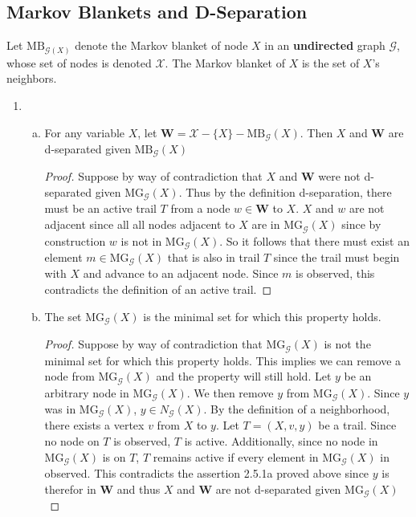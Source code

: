 \documentclass[12pt]{article}
\newcommand{\mg} {\text{MG}_{\mathcal{G}}}
\begin{document}
\subsection{Markov Blankets and D-Separation}
Let $\text{MB}_{\mathcal{G}(X)}$ denote the Markov blanket of node $X$ in an \textbf{undirected} graph $\mathcal{G}$, whose set of nodes is denoted $\mathcal{X}$. The Markov blanket of $X$ is the set of $X$'s neighbors. 
\begin{enumerate}[1.]	
	\item 
	\begin{enumerate}[(a)]
		\item For any variable $X$, let $\mathbf{W} = \mathcal{X} - \{X\} - \text{MB}_{\mathcal{G}}(X)$. Then $X$ and $\mathbf{W}$ are d-separated given $\text{MB}_{\mathcal{G}}(X)$
		\begin{proof}
		Suppose by way of contradiction that $X$ and $\mathbf{W}$ were not d-separated given $\text{MG}_{\mathcal{G}}(X)$. Thus by the definition d-separation, there must be an active trail $T$  from a node $w\in \mathbf{W}$ to $X$. $X$ and $w$ are not adjacent since all all nodes adjacent to $X$ are in $\text{MG}_{\mathcal{G}}(X)$ since by construction $w$ is not in $\text{MG}_{\mathcal{G}}(X)$. So it follows that there must exist an element $m \in \text{MG}_{\mathcal{G}}(X)$ that is also in trail $T$ since the trail must begin with $X$ and advance to an adjacent node. Since $m$ is observed, this contradicts the definition of an active trail.
		\end{proof}
	\item The set $\text{MG}_{\mathcal{G}}(X)$ is the minimal set for which this property holds. 
		\begin{proof}
		Suppose by way of contradiction that $\mg(X)$ is not the minimal set for which this property holds. This implies we can remove a node from $\mg(X)$ and the property will still hold. Let $y$ be an arbitrary node in $\mg(X)$. We then remove $y$ from $\mg(X)$. Since $y$ was in $\mg(X)$,  $y \in N_\mathcal{G}(X)$. By the definition of a neighborhood, there exists a vertex $v$ from $X$ to $y$.  Let $T = (X, v, y)$ be a trail. Since no node on $T$ is observed, $T$ is active. Additionally, since no node in $\mg(X)$ is on $T$, $T$ remains active if every element in $\mg(X)$ in observed. This contradicts the assertion 2.5.1a proved above since $y$ is therefor in $\mathbf{W}$ and thus $X$ and $\mathbf{W}$ are not d-separated given $\mg(X)$
		\end{proof}
	\end{enumerate}

\end{enumerate}
\end{document}
